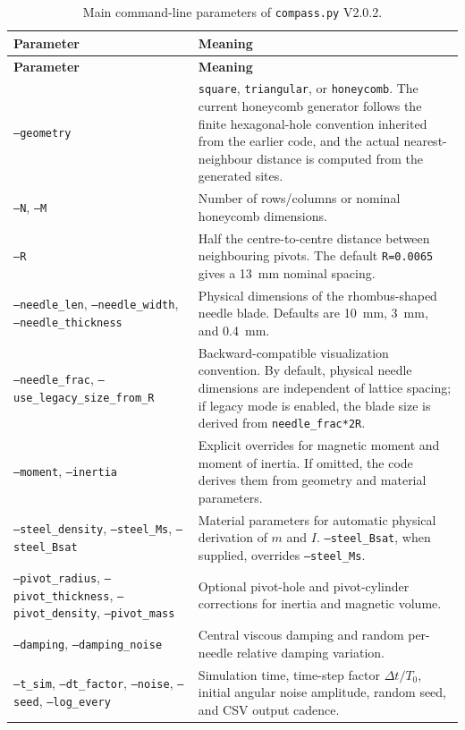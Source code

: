 \documentclass[11pt,a4paper]{article}
\newcommand{\code}[1]{\texttt{#1}}
\begin{document}
\begin{longtable}{@{}p{4.4cm}p{10.4cm}@{}}
\caption{Main command-line parameters of \code{compass.py} V2.0.2.}\label{tab:cli}\\
\toprule
\textbf{Parameter} & \textbf{Meaning}\\
\midrule
\endfirsthead
\toprule
\textbf{Parameter} & \textbf{Meaning}\\
\midrule
\endhead
\bottomrule
\endfoot
\code{--geometry} & \code{square}, \code{triangular}, or \code{honeycomb}. The current honeycomb generator follows the finite hexagonal-hole convention inherited from the earlier code, and the actual nearest-neighbour distance is computed from the generated sites.\\
\code{--N}, \code{--M} & Number of rows/columns or nominal honeycomb dimensions.\\
\code{--R} & Half the centre-to-centre distance between neighbouring pivots. The default \code{R=0.0065} gives a \SI{13}{mm} nominal spacing.\\
\code{--needle\_len}, \code{--needle\_width}, \code{--needle\_thickness} & Physical dimensions of the rhombus-shaped needle blade. Defaults are \SI{10}{mm}, \SI{3}{mm}, and \SI{0.4}{mm}.\\
\code{--needle\_frac}, \code{--use\_legacy\_size\_from\_R} & Backward-compatible visualization convention. By default, physical needle dimensions are independent of lattice spacing; if legacy mode is enabled, the blade size is derived from \code{needle\_frac*2R}.\\
\code{--moment}, \code{--inertia} & Explicit overrides for magnetic moment and moment of inertia. If omitted, the code derives them from geometry and material parameters.\\
\code{--steel\_density}, \code{--steel\_Ms}, \code{--steel\_Bsat} & Material parameters for automatic physical derivation of $m$ and $I$. \code{--steel\_Bsat}, when supplied, overrides \code{--steel\_Ms}.\\
\code{--pivot\_radius}, \code{--pivot\_thickness}, \code{--pivot\_density}, \code{--pivot\_mass} & Optional pivot-hole and pivot-cylinder corrections for inertia and magnetic volume.\\
\code{--damping}, \code{--damping\_noise} & Central viscous damping and random per-needle relative damping variation.\\
\code{--t\_sim}, \code{--dt\_factor}, \code{--noise}, \code{--seed}, \code{--log\_every} & Simulation time, time-step factor $\Delta t/T_0$, initial angular noise amplitude, random seed, and CSV output cadence.\\

\end{longtable}
\end{document}
